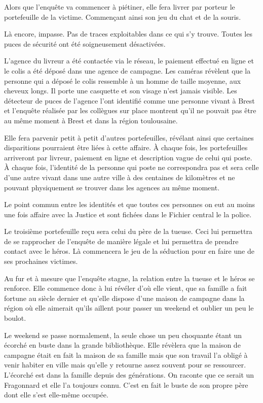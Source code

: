 Alors que l'enquête va commencer à piétiner, elle fera livrer par porteur le
portefeuille de la victime. Commençant ainsi son jeu du chat et de la souris.

Là encore, impasse. Pas de traces exploitables dans ce qui s'y trouve. Toutes
les puces de sécurité ont été soigneusement désactivées.

L'agence du livreur a été contactée via le réseau, le paiement effectué en ligne
et le colis a été déposé dans une agence de campagne. Les caméras révèlent que
la personne qui a déposé le colis ressemble à un homme de taille moyenne, aux
cheveux longs. Il porte une casquette et son visage n'est jamais visible. Les
détecteur de puces de l'agence l'ont identifié comme une personne vivant à Brest
et l'enquête réalisée par les collègues sur place montrent qu'il ne pouvait pas
être au même moment à Brest et dans la région toulousaine.

Elle fera parvenir petit à petit d'autres portefeuilles, révélant ainsi que
certaines disparitions pourraient être liées à cette affaire. À chaque fois,
les portefeuilles arriveront par livreur, paiement en ligne et description
vague de celui qui poste. À chaque fois, l'identité de la personne qui poste ne
correspondra pas et sera celle d'une autre vivant dans une autre ville à des
centaines de kilomètres et ne pouvant physiquement se trouver dans les agences
au même moment.

Le point commun entre les identités et que toutes ces personnes on eut au moins
une fois affaire avec la Justice et sont fichées dans le Fichier central le la
police.

Le troisième portefeuille reçu sera celui du père de la tueuse. Ceci lui
permettra de se rapprocher de l'enquête de manière légale et lui permettra de
prendre contact avec le héros. Là commencera le jeu de la séduction pour en
faire une de ses prochaines victimes.

Au fur et à mesure que l'enquête stagne, la relation entre la tueuse et le
héros se renforce. Elle commence donc à lui révéler d'où elle vient, que sa
famille a fait fortune au siècle dernier et qu'elle dispose d'une maison de
campagne dans la région où elle aimerait qu'ils aillent pour passer un weekend
et oublier un peu le boulot.

Le weekend se passe normalement, la seule chose un peu choquante étant un
écorché en buste dans la grande bibliothèque. Elle révèlera que la maison de
campagne était en fait la maison de sa famille mais que son travail l'a obligé
à venir habiter en ville mais qu'elle y retourne assez souvent pour se
ressourcer. L'écorché est dans la famille depuis des générations. On raconte
que ce serait un Fragonnard et elle l'a toujours connu. C'est en fait le buste
de son propre père dont elle s'est elle-même occupée.

